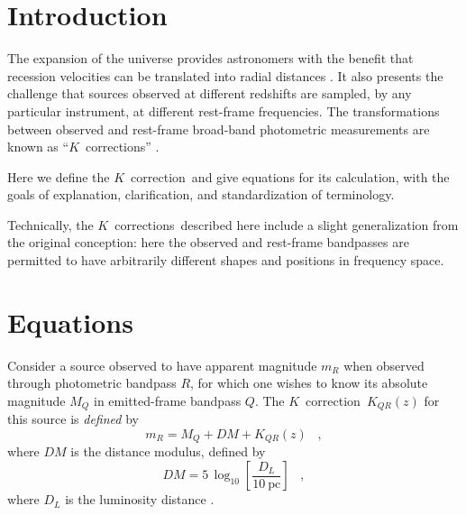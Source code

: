 \documentclass[preprint]{aastex}
\newcommand{\kcorrection}{$K$~correction}
\newcommand{\kcorrections}{{\kcorrection}s}
\begin{document}
\title{\scalebox{1.5}{The \kcorrection}}
\author{
  David W. Hogg,
  Michael Blanton,
  Daniel J. Eisenstein,
  and Ivan K. Baldry\\
  \textsl{third draft---2002 July 30}
}

\begin{abstract}
The \kcorrection\ is used to relate the rest-frame absolute magnitude
of a source in one broad photometric bandpass to the observed-frame
apparent magnitude of the same source in another broad bandpass.  This
short paper provides definitions, equations and pedagogical discussion
related to the \kcorrection.
\end{abstract}

\section{Introduction}

The expansion of the universe provides astronomers with the benefit
that recession velocities can be translated into radial distances
\citep[eg,][and references therein]{hogg99cosm}.  It also presents the
challenge that sources observed at different redshifts are sampled, by
any particular instrument, at different rest-frame frequencies.  The
transformations between observed and rest-frame broad-band photometric
measurements are known as ``\kcorrections'' \citep*{humason56a,
oke68a}.

Here we define the \kcorrection\ and give equations for its
calculation, with the goals of explanation, clarification, and
standardization of terminology.

Technically, the \kcorrections\ described here include a slight
generalization from the original conception: here the observed and
rest-frame bandpasses are permitted to have arbitrarily different
shapes and positions in frequency space.

\section{Equations}

Consider a source observed to have apparent magnitude $m_R$ when
observed through photometric bandpass $R$, for which one wishes to
know its absolute magnitude $M_Q$ in emitted-frame bandpass $Q$.  The
\kcorrection\ $K_{QR}(z)$ for this source is \emph{defined} by
\begin{equation}
\label{eq:definition}
m_R = M_Q + DM + K_{QR}(z) \;\;\;,
\end{equation}
where $DM$ is the distance modulus, defined by
\begin{equation}
DM = 5\,\log_{10}\left[\frac{D_L}{10~\mathrm{pc}}\right] \;\;\;,
\end{equation}
where $D_L$ is the luminosity distance \citep[eg,][]{hogg99cosm}.
\end{document}
